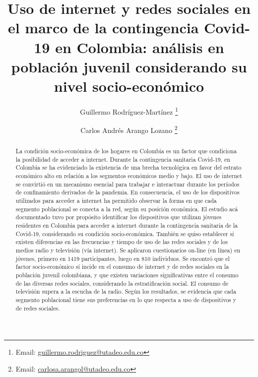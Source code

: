 \documentclass[spanish]{textolivre}
\title{Uso de internet y redes sociales en el marco de la contingencia Covid-19 en Colombia: análisis en población juvenil considerando su nivel socio-económico}
\author[1]{Guillermo Rodríguez-Martínez \orcid{0000-0003-4329-5745} \thanks{Email: \url{guillermo.rodriguez@utadeo.edu.co}}}
\author[2]{Carlos Andrés Arango Lozano \orcid{0000-0002-2786-3653} \thanks{Email: \url{carlosa.arangol@utadeo.edu.co}}}
\affil[1]{Universidad Jorge Tadeo Lozano, Bogotá, Colombia.}
\begin{document}
\maketitle

\begin{polyabstract}
\begin{abstract}
La condición socio-económica de los hogares en Colombia es un factor que condiciona la posibilidad de acceder a internet. Durante la contingencia sanitaria Covid-19, en Colombia se ha evidenciado la existencia de una brecha tecnológica en favor del estrato económico alto en relación a los segmentos económicos medio y bajo. El uso de internet se convirtió en un mecanismo esencial para trabajar e interactuar durante los períodos de confinamiento derivados de la pandemia. En consecuencia, el uso de los dispositivos utilizados para acceder a internet ha permitido observar la forma en que cada segmento poblacional se conecta a la red, según su posición económica. El estudio acá documentado tuvo por propósito identificar los dispositivos que utilizan jóvenes residentes en Colombia para acceder a internet durante la contingencia sanitaria de la Covid-19, considerando su condición socio-económica. También se quiso establecer si existen diferencias en las frecuencias y tiempo de uso de las redes sociales y de los medios radio y televisión (vía internet). Se aplicaron cuestionarios on-line (en línea) en jóvenes, primero en 1419 participantes, luego en 810 individuos. Se encontró que el factor socio-económico sí incide en el consumo de internet y de redes sociales en la población juvenil colombiana, y que existen variaciones significativas entre el consumo de las diversas redes sociales, considerando la estratificación social. El consumo de televisión supera a la escucha de la radio. Según los resultados, se evidencia que cada segmento poblacional tiene sus preferencias en lo que respecta a uso de dispositivos y de redes sociales.

\end{abstract}


\end{polyabstract}
\end{document}
